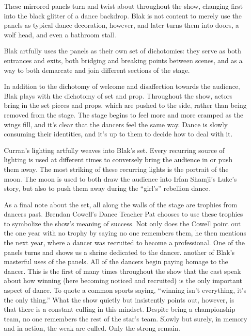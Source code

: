 \documentclass[12pt]{article}[titlepage]
\newcommand{\say}[1]{``#1''}
\newcommand{\1}{\={a}}
\newcommand{\2}{\={e}}
\newcommand{\3}{\={\i}}
\newcommand{\4}{\=o}
\newcommand{\5}{\=u}
\newcommand{\6}{\={A}}
\renewcommand{\,}{\textsuperscript{,}}
\begin{document}
These mirrored panels turn and twist about throughout the show, changing first into the black glitter of a dance backdrop.
Blak is not content to merely use the panels as typical dance decoration, however, and later turns them into doors, a wolf head, and even a bathroom stall.

Blak artfully uses the panels as their own set of dichotomies: they serve as both entrances and exits, both bridging and breaking points between scenes, and as a way to both demarcate and join different sections of the stage.

In addition to the dichotomy of welcome and disaffection towards the audience, Blak plays with the dichotomy of set and prop.
Throughout the show, actors bring in the set pieces and props, which are pushed to the side, rather than being removed from the stage.
The stage begins to feel more and more cramped as the wings fill, and it's clear that the dancers feel the same way.
Dance is slowly consuming their identities, and it's up to them to decide how to deal with it.

Curran's lighting artfully weaves into Blak's set.
Every recurring source of lighting is used at different times to conversely bring the audience in or push them away.
The most striking of these recurring lights is the portrait of the moon.
The moon is used to both draw the audience into Irfan Shamji's Luke's story, but also to push them away during the \say{girl's} rebellion dance.

As a final note about the set, all along the walls of the stage are trophies from dancers past.
Brendan Cowell's Dance Teacher Pat chooses to use these trophies to symbolize the show's meaning of success.
Not only does the Cowell point out the one year with no trophy by saying no one remembers them, he then mentions the next year, where a dancer was recruited to become a professional.
One of the panels turns and shows us a shrine dedicated to the dancer. another of Blak's masterful uses of the panels.
All of the dancers begin paying homage to the dancer.
This is the first of many times throughout the show that the cast speak about how winning (here becoming noticed and recruited) is the only important aspect of dance.
To quote a common sports saying, \say{winning isn't everything, it's the only thing.}
What the show quietly but insistently points out, however, is that there is a constant culling in this mindset.
Despite being a championship team, no one remembers the rest of the star's team.
Slowly but surely, in memory and in action, the weak are culled.
Only the strong remain.
\end{document}
